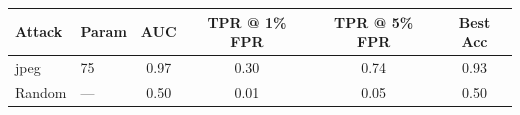 \begin{tabular}{llcccc}
\toprule
Attack & Param & AUC & TPR @ 1\% FPR & TPR @ 5\% FPR & Best Acc \\
\midrule
jpeg & 75 & 0.97 & 0.30 & 0.74 & 0.93 \\
Random & — & 0.50 & 0.01 & 0.05 & 0.50 \\
\bottomrule
\end{tabular}

